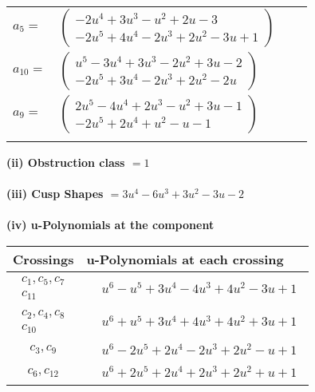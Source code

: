 \documentclass[1p]{elsarticle_modified}
\theoremstyle{definition}
\begin{document}
\begin{tabular}{m{7pt} m{180pt} m{7pt} m{180pt} }
\flushright $a_{5}=$&$\begin{pmatrix}-2 u^4+3 u^3- u^2+2 u-3\\-2 u^5+4 u^4-2 u^3+2 u^2-3 u+1\end{pmatrix}$ \\
\flushright $a_{10}=$&$\begin{pmatrix}u^5-3 u^4+3 u^3-2 u^2+3 u-2\\-2 u^5+3 u^4-2 u^3+2 u^2-2 u\end{pmatrix}$ \\
\flushright $a_{9}=$&$\begin{pmatrix}2 u^5-4 u^4+2 u^3- u^2+3 u-1\\-2 u^5+2 u^4+u^2- u-1\end{pmatrix}$\\&\end{tabular}
\flushleft \textbf{(ii) Obstruction class $= 1$}\\~\\
\flushleft \textbf{(iii) Cusp Shapes $= 3 u^4-6 u^3+3 u^2-3 u-2$}\\~\\
\newpage\renewcommand{\arraystretch}{1}
\flushleft \textbf{(iv) u-Polynomials at the component}\newline \\
\begin{tabular}{m{50pt}|m{274pt}}
Crossings & \hspace{64pt}u-Polynomials at each crossing \\
\hline $$\begin{aligned}c_{1},c_{5},c_{7}\\c_{11}\end{aligned}$$&$\begin{aligned}
&u^6- u^5+3 u^4-4 u^3+4 u^2-3 u+1
\end{aligned}$\\
\hline $$\begin{aligned}c_{2},c_{4},c_{8}\\c_{10}\end{aligned}$$&$\begin{aligned}
&u^6+u^5+3 u^4+4 u^3+4 u^2+3 u+1
\end{aligned}$\\
\hline $$\begin{aligned}c_{3},c_{9}\end{aligned}$$&$\begin{aligned}
&u^6-2 u^5+2 u^4-2 u^3+2 u^2- u+1
\end{aligned}$\\
\hline $$\begin{aligned}c_{6},c_{12}\end{aligned}$$&$\begin{aligned}
&u^6+2 u^5+2 u^4+2 u^3+2 u^2+u+1
\end{aligned}$\\
\hline
\end{tabular}\\~\\
\end{document}
